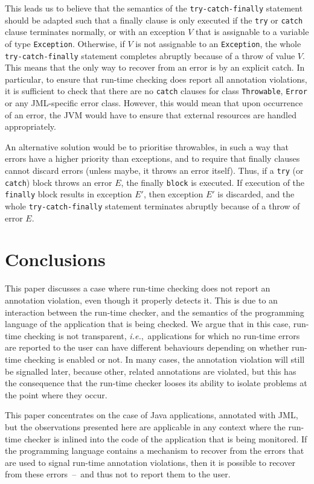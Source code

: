 \documentclass[]{llncs}
\begin{document}
This leads us to believe that the semantics of the
\texttt{try-catch-finally} statement should be adapted such that a
finally clause is only executed if the \texttt{try} or \texttt{catch}
clause terminates normally, or with an exception \(V\) that is
assignable to a variable of type \texttt{Exception}. Otherwise, if
\(V\) is not assignable to an \texttt{Exception}, the
whole \texttt{try-catch-finally} statement completes abruptly because
of a throw of value \(V\). This means that the only way to recover
from an error is by an explicit catch. In particular, to
ensure that run-time checking does report all annotation violations,
it is sufficient to check that there are no \texttt{catch} clauses for
class \texttt{Throwable}, \texttt{Error} or any JML-specific error
class. However, this would mean that upon occurrence of an error, the
JVM would have to ensure that external resources are handled
appropriately. 

An alternative solution would be to prioritise throwables, in such a
way that errors have a higher priority than exceptions, and to require
that finally clauses cannot discard errors (unless maybe, it throws an
error itself). Thus, if a \texttt{try} (or \texttt{catch}) block
throws an error \(E\), the finally \texttt{block} is executed. If
execution of the \texttt{finally} block results in exception \(E'\),
then exception \(E'\) is discarded, and the whole
\texttt{try-catch-finally} statement terminates abruptly because of a
throw of error \(E\).



\section{Conclusions}\label{SecConcl}
This paper discusses a case where run-time checking does not report an
annotation violation, even though it properly detects it. This is due
to an interaction between the run-time checker, and the semantics of
the programming language of the application that is being checked. We
argue that in this case, run-time checking is not transparent,
\emph{i.e.},\ applications for which no run-time errors are reported
to the user can have different behaviours depending on whether
run-time checking is enabled or not. In many cases, the annotation
violation will still be signalled later, because other, related
annotations are violated, but this has the consequence that the
run-time checker looses its ability to isolate problems at the point
where they occur.

This paper concentrates on the case of Java applications, annotated
with JML, but the observations presented here are applicable in any
context where the run-time checker is inlined into the code of the
application that is being monitored. If the programming language
contains a mechanism to recover from the errors that are used to
signal run-time annotation violations, then it is possible to recover
from these errors~--~and thus not to report them to the user.
\end{document}
